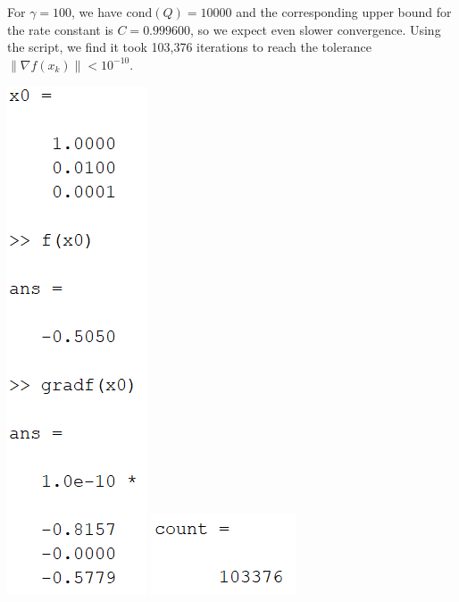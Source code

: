 \documentclass{article}
\begin{document}
For $\gamma = 100$, we have $\text{cond}(Q) = 10000$ and the corresponding upper bound for the rate constant is $C = 0.999600$, so we expect even slower convergence. Using the script, we find it took 103,376 iterations to reach the tolerance $\|\nabla f(x_k) \| < 10^{-10}$.
\begin{center}
    \includegraphics[scale = 0.9]{gamma100vals}
    \newline
    \includegraphics{gamma100count}
    \newline\newline
\end{center}
\end{document}
